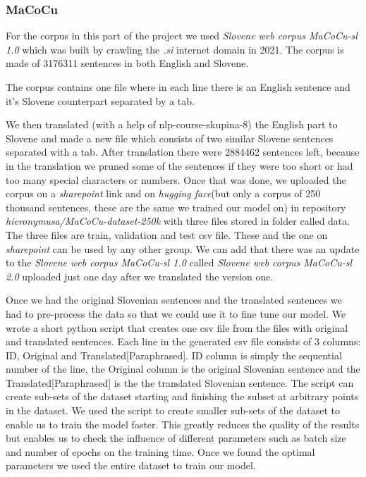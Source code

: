 \documentclass[fleqn,moreauthors,10pt]{ds_report}
\begin{document}
\subsubsection{MaCoCu}
For the corpus in this part of the project we used \emph{Slovene web corpus MaCoCu-sl 1.0
} which was built by crawling the \emph{.si} internet domain in 2021. The corpus is made of 3176311 sentences in both English and Slovene.

The corpus contains one file where in each line there is an English sentence and it's Slovene counterpart separated by a tab.

We then translated (with a help of nlp-course-skupina-8) the English part to Slovene and made a new file which consists of two similar Slovene sentences separated with a tab. After translation there were 2884462 sentences left, because in the translation we pruned some of the sentences if they were too short or had too many special characters or numbers. Once that was done, we uploaded the corpus on a \emph{sharepoint} link and on \emph{hugging face}(but only a corpus of 250 thousand sentences, these are the same we trained our model on) in repository \emph{hieronymusa/MaCoCu-dataset-250k} with three files stored in folder called data. The three files are train, validation and test csv file. These and the one on \emph{sharepoint} can be used by any other group. We can add that there was an update to the \emph{Slovene web corpus MaCoCu-sl 1.0} called \emph{Slovene web corpus MaCoCu-sl 2.0
} uploaded just one day after we translated the version one.

Once we had the original Slovenian sentences and the translated sentences we had to pre-process the data so that we could use it to fine tune our model. We wrote a short python script that creates one csv file from the files with original and translated sentences. Each line in the generated csv file consists of 3 columns: ID, Original and Translated[Paraphrased]. ID column is simply the sequential number of the line, the Original column is the original Slovenian sentence and the Translated[Paraphrased] is the the translated Slovenian sentence. 
The script can create sub-sets of the dataset starting and finishing the subset at arbitrary points in the dataset. We used the script to create smaller sub-sets of the dataset to enable us to train the model faster. 
This greatly reduces the quality of the results but enables us to check the influence of different parameters such as batch size and number of epochs on the training time. Once we found the optimal parameters we used the entire dataset to train our model. 
\end{document}
